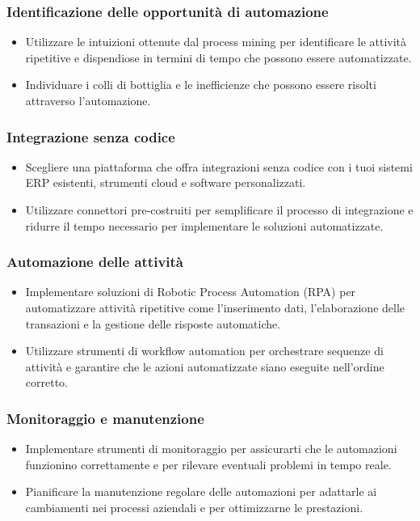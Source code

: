 \documentclass{article}
\begin{document}
\subsubsection{Identificazione delle opportunità di automazione}
\begin{itemize}
    \item Utilizzare le intuizioni ottenute dal process mining per identificare le attività ripetitive e dispendiose in termini di tempo che possono essere automatizzate.
    \item Individuare i colli di bottiglia e le inefficienze che possono essere risolti attraverso l'automazione.
\end{itemize}
\subsubsection{Integrazione senza codice}
\begin{itemize}
    \item Scegliere una piattaforma che offra integrazioni senza codice con i tuoi sistemi ERP esistenti, strumenti cloud e software personalizzati.
    \item Utilizzare connettori pre-costruiti per semplificare il processo di integrazione e ridurre il tempo necessario per implementare le soluzioni automatizzate.
\end{itemize}
\subsubsection{Automazione delle attività}
\begin{itemize}
    \item Implementare soluzioni di Robotic Process Automation (RPA) per automatizzare attività ripetitive come l'inserimento dati, l'elaborazione delle transazioni e la gestione delle risposte automatiche.
    \item Utilizzare strumenti di workflow automation per orchestrare sequenze di attività e garantire che le azioni automatizzate siano eseguite nell'ordine corretto.
\end{itemize}
\subsubsection{Monitoraggio e manutenzione}
\begin{itemize}
    \item Implementare strumenti di monitoraggio per assicurarti che le automazioni funzionino correttamente e per rilevare eventuali problemi in tempo reale.
    \item Pianificare la manutenzione regolare delle automazioni per adattarle ai cambiamenti nei processi aziendali e per ottimizzarne le prestazioni.
\end{itemize}
\end{document}
